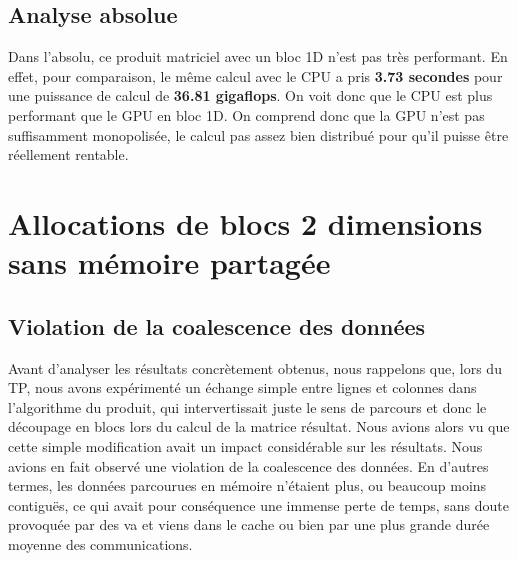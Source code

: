 \documentclass[	DIV=calc,%
							paper=a4,%
							fontsize=11pt%
							]{scrartcl}	 					%
\begin{document}
\subsection{Analyse absolue}
Dans l'absolu, ce produit matriciel avec un bloc 1D n'est pas très performant. En effet, pour comparaison, le même calcul avec le CPU a pris \textbf{3.73 secondes} pour une puissance de calcul de \textbf{36.81 gigaflops}. On voit donc que le CPU est plus performant que le GPU en bloc 1D. On comprend donc que la GPU n'est pas suffisamment monopolisée, le calcul pas assez bien distribué pour qu'il puisse être réellement rentable.

\section{Allocations de blocs 2 dimensions sans mémoire partagée}

\subsection{Violation de la coalescence des données}
Avant d'analyser les résultats concrètement obtenus, nous rappelons que, lors du TP, nous avons expérimenté un échange simple entre lignes et colonnes dans l'algorithme du produit, qui intervertissait juste le sens de parcours et donc le découpage en blocs lors du calcul de la matrice résultat. Nous avions alors vu que cette simple modification avait un impact considérable sur les résultats. Nous avions en fait observé une violation de la coalescence des données. En d'autres termes, les données parcourues en mémoire n'étaient plus, ou beaucoup moins contiguës, ce qui avait pour conséquence une immense perte de temps, sans doute provoquée par des va et viens dans le cache ou bien par une plus grande durée moyenne des communications.
\end{document}
